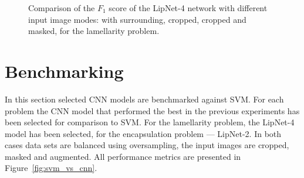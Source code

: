 \documentclass[a4paper, 11pt, table]{article}
\begin{document}
\begin{figure}[H]
\centering


\caption{\label{fig:input_img_comparison_lamellarity}Comparison of the $F_1$ score of the LipNet-4 network with different input image modes: with surrounding, cropped, cropped and masked, for the lamellarity problem.}
\end{figure}


\newpage
\section{Benchmarking}

In this section selected CNN models are benchmarked against SVM. For each problem the CNN model that performed the best in the previous experiments has been selected for comparison to SVM. For the lamellarity problem, the LipNet-4 model has been selected, for the encapsulation problem --- LipNet-2. In both cases data sets are balanced using oversampling, the input images are cropped, masked and augmented. All performance metrics are presented in Figure~\ref{fig:svm_vs_cnn}. 
\end{document}
